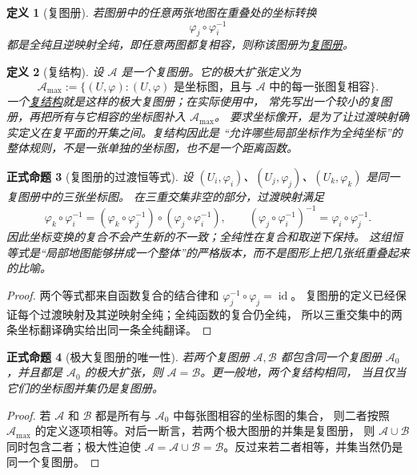\documentclass[UTF8,fontset=none,a4paper,11pt]{ctexart}
\theoremstyle{foundation-definition}
\newtheorem{definition}{定义}[section]
\theoremstyle{foundation-theorem}
\theoremstyle{foundation-proposition}
\newtheorem{proposition}[definition]{正式命题}
\theoremstyle{foundation-example}
\theoremstyle{foundation-remark}
\theoremstyle{foundation-theorem}
\newcommand{\term}[2]{\hyperref[#1]{#2}}
\begin{document}
\begin{definition}[复图册]\label{def:complex-atlas}
若图册中的任意两张地图在重叠处的坐标转换
\[
\varphi_j\circ\varphi_i^{-1}
\]
都是全纯且逆映射全纯，即任意两图都复相容，则称该图册为\term{def:complex-atlas}{复图册}。
\end{definition}

\begin{definition}[复结构]\label{def:complex-structure}
设 \(\mathcal A\) 是一个复图册。它的极大扩张定义为
\[
\mathcal A_{\max}
:=\bigl\{(U,\varphi): (U,\varphi)\text{ 是坐标图，且与 }\mathcal A
\text{ 中的每一张图复相容}\bigr\}.
\]
一个\term{def:complex-structure}{复结构}就是这样的极大复图册；在实际使用中，
常先写出一个较小的复图册，再把所有与它相容的坐标图补入 \(\mathcal A_{\max}\)。
要求坐标像开，是为了让过渡映射确实定义在复平面的开集之间。复结构因此是
“允许哪些局部坐标作为全纯坐标”的整体规则，不是一张单独的坐标图，也不是一个距离函数。
\end{definition}

\begin{proposition}[复图册的过渡恒等式]\label{prop:complex-atlas-cocycle}
设 \((U_i,\varphi_i)\)、\((U_j,\varphi_j)\)、\((U_k,\varphi_k)\) 是同一复图册中的三张坐标图。
在三重交集非空的部分，过渡映射满足
\[
\varphi_k\circ\varphi_i^{-1}
  =(\varphi_k\circ\varphi_j^{-1})
    \circ(\varphi_j\circ\varphi_i^{-1}),
\qquad
(\varphi_j\circ\varphi_i^{-1})^{-1}
  =\varphi_i\circ\varphi_j^{-1}.
\]
因此坐标变换的复合不会产生新的不一致；全纯性在复合和取逆下保持。
这组恒等式是“局部地图能够拼成一个整体”的严格版本，而不是图形上把几张纸重叠起来的比喻。
\end{proposition}

\begin{proof}
两个等式都来自函数复合的结合律和 \(\varphi_j^{-1}\circ\varphi_j=\operatorname{id}\)。
复图册的定义已经保证每个过渡映射及其逆映射全纯；全纯函数的复合仍全纯，
所以三重交集中的两条坐标翻译确实给出同一条全纯翻译。
\end{proof}

\begin{proposition}[极大复图册的唯一性]\label{prop:complex-structure-maximality}
若两个复图册 \(\mathcal A,\mathcal B\) 都包含同一个复图册 \(\mathcal A_0\)，并且都是
\(\mathcal A_0\) 的极大扩张，则 \(\mathcal A=\mathcal B\)。更一般地，两个复结构相同，
当且仅当它们的坐标图并集仍是复图册。
\end{proposition}

\begin{proof}
若 \(\mathcal A\) 和 \(\mathcal B\) 都是所有与 \(\mathcal A_0\) 中每张图相容的坐标图的集合，
则二者按照 \(\mathcal A_{\max}\) 的定义逐项相等。对后一断言，若两个极大图册的并集是复图册，
则 \(\mathcal A\cup\mathcal B\) 同时包含二者；极大性迫使
\(\mathcal A=\mathcal A\cup\mathcal B=\mathcal B\)。反过来若二者相等，并集当然仍是同一个复图册。
\end{proof}
\end{document}
